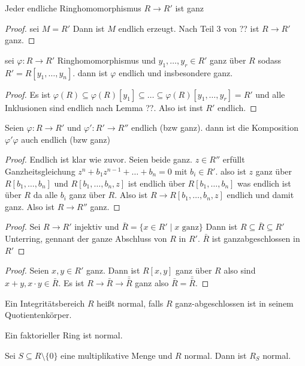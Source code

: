 \begin{Kor}
    Jeder endliche Ringhomomorphismus $R\to R'$ ist ganz 
\end{Kor}
\begin{proof}
    sei $M=R'$ Dann ist $M$ endlich erzeugt. Nach Teil 3 von ?? ist $R\to R'$ ganz.
\end{proof}
\begin{Kor}
    sei $\varphi\colon R\to R'$ Ringhomomorphismus und $y_1,\dots,y_r\in R'$ ganz über $R$ sodass $R'=R[y_1,\dots,y_n]$.
    dann ist $\varphi$ endlich und insbesondere ganz.
\end{Kor}
\begin{proof}
    Es ist $\varphi(R)\subseteq\varphi(R)[y_1]\subseteq\dots\subseteq \varphi(R)[y_1,\dots,y_r]=R'$ und alle Inklusionen sind endlich nach Lemma ??. Also ist inst $R'$ endlich.
\end{proof}
\begin{Kor}
    Seien $\varphi\colon R\to R'$ und $\varphi'\colon R'\to R''$ endlich (bzw ganz). dann ist die Komposition $\varphi'\varphi$ auch endlich (bzw ganz)
\end{Kor}
\begin{proof}
    Endlich ist klar wie zuvor. Seien beide ganz.
    $z\in R''$ erfüllt Ganzheitsgleichung $z^n+b_1z^{n-1}+\dots+b_n=0$ mit $b_i\in R'$.
    also ist $z$ ganz über $R[b_1,\dots,b_n]$ und $R[b_1,\dots,b_n,z]$ ist endlich über $R[b_1,\dots,b_n]$ was endlich ist über $R$ da alle $b_i$ ganz über $R$. Also ist $R\to R[b_1,\dots,b_n,z]$ endlich und damit ganz.
    Also ist $R\to R''$ ganz.
\end{proof}
\begin{proof}
    Sei $R\to R'$ injektiv und $\bar R=\{x\in R'\mid x \text{ ganz}\}$ Dann ist $R\subseteq \bar R\subseteq R'$ Unterring, gennant der ganze Abschluss von $R$ in $R'$. $\bar R$ ist ganzabgeschlossen in $R'$
\end{proof}
\begin{proof}
    Seien $x,y\in R'$ ganz. Dann ist $R[x,y]$ ganz über $R$ also sind $x+y,x\cdot y\in \bar R$. Es ist $R\to \bar R\to \bar{\bar R}$ ganz also $\bar R=\bar{\bar R}$.
\end{proof}
\begin{Def}
    Ein Integritätsbereich $R$ heißt normal, falls $R$ ganz-abgeschlossen ist in seinem Quotientenkörper.
\end{Def}
\begin{Bem}
    Ein faktorieller Ring ist normal.
\end{Bem}
\begin{Lemma}
    Sei $S\subseteq R\setminus\{0\}$ eine multiplikative Menge und $R$ normal. Dann ist $R_S$ normal.
\end{Lemma}
